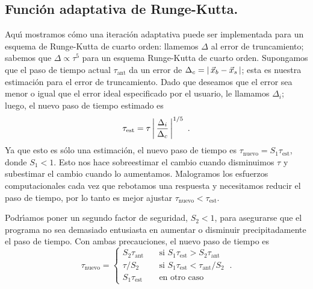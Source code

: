\subsection{Funci{\'o}n adaptativa de  Runge-Kutta.}

Aqu{\'\i} mostramos c{\'o}mo una iteraci{\'o}n adaptativa puede ser implementada
para un esquema de Runge-Kutta de cuarto orden: llamemos $\Delta$ al error
de truncamiento; sabemos que $\Delta \propto \tau^5$ para un esquema Runge-Kutta
de cuarto orden. Supongamos que el paso de tiempo actual
$\tau_{\text{ant}}$ da un error de $\Delta_c= \left\lvert\, \vec x_b-\vec x_s \,\right\lvert$;
esta es nuestra estimaci{\'o}n para el error de truncamiento. Dado que
deseamos que el error sea menor o igual que el error ideal
especificado por el usuario, le llamamos $\Delta_i$; luego, el nuevo paso
de tiempo estimado es
\begin{equation}
\label{c11-e3.30}
\tau_{\text{est}}=\tau\modulo{\frac{\Delta_i}{\Delta_c}}^{1/5}\ .
\end{equation}
Ya que esto es s{\'o}lo una estimaci{\'o}n, el nuevo paso de tiempo es
$\tau_{\text{nuevo}}=S_1 \tau_{\text{est}}$, donde $S_1<1$.  Esto nos hace
sobreestimar el cambio cuando disminuimos $\tau$ y subestimar el cambio
cuando lo aumentamos.  Malogramos los esfuerzos computacionales cada
vez que rebotamos una respuesta y necesitamos reducir el paso de
tiempo, por lo tanto es mejor ajustar $\tau_{\text{nuevo}}<\tau_{\text{est}}$.

Podr{\'\i}amos poner un segundo factor de seguridad, $S_2<1$, para
asegurarse que el programa no sea demasiado entusiasta en aumentar o
disminuir precipitadamente el paso de tiempo. Con ambas precauciones,
el nuevo paso de tiempo es
\begin{equation}
\label{c11-e3.31}
\tau_{\text{nuevo}}=
\begin{cases}
S_2\tau_{\text{ant}} \quad &\text{si }S_1\tau_{\text{est}}>S_2\tau_{\text{ant}}\\
\tau/S_2\quad &\text{si }S_1\tau_{\text{est}}<\tau_{\text{ant}}/S_2\\
S_1\tau_{\text{est}} &\text{en otro caso}
\end{cases}\ .
\end{equation}

